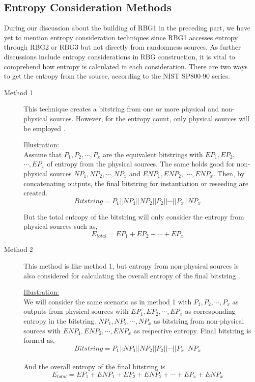 %
%
\subsection{Entropy Consideration Methods}
\label{subsec:SoA:ECM}
During our discussion about the building of RBG1 in the preceding part, we have yet to mention entropy consideration techniques since RBG1 accesses entropy through RBG2 or RBG3 but not directly from randomness sources. As further discussions include entropy considerations in RBG construction, it is vital to comprehend how entropy is calculated in each consideration. There are two ways to get the entropy from the source, according to the NIST SP800-90 series.

\begin{description}
	\item[Method 1] This technique creates a bitstring from one or more physical and non-physical sources. However, for the entropy count, only physical sources will be employed \cite{SP90C-2022}.
	
	\underline{Illustration:}\\
	Assume that $P_{1},P_{2},\cdots,P_{x}$  are the equivalent bitstrings with $EP_{1},EP_{2},$ $\cdots,EP_{x}$  of entropy from the physical sources. The same holds good for non-physical sources $NP_{1},NP_{2},\cdots,NP_{x}$ and $ENP_{1},ENP_{2},$ $\cdots,ENP_{x}$. Then, by concatenating outputs, the final bitstring for instantiation or reseeding are created.
	\begin{equation*}
	Bitstring = P_{1}||NP_{1}||NP_{2}||P_{2}||\cdots||P_{x}||NP_{x}
	\end{equation*}
	
	But the total entropy of the bitstring will only consider the entropy from physical sources such as,
	\begin{equation*}
	E_{total} = EP_{1} + EP_{2} + \cdots + EP_{x} 
	\end{equation*}
	
	\item[Method 2] This method is like method 1, but entropy from non-physical sources is also considered for calculating the overall entropy of the final bitstring \cite{SP90C-2022}.
	
	\underline{Illustration:}\\
	We will consider the same scenario as in method 1 with  $P_{1},P_{2},\cdots,P_{x}$ as outputs from physical sources with $EP_{1},EP_{2},\cdots,EP_{x}$  as corresponding entropy in the bitstring. $NP_{1},NP_{2},\cdots,NP_{x}$ as bitstring from non-physical sources with  $ENP_{1},ENP_{2},\cdots,ENP_{x}$ as respective entropy. Final bitstring is formed as,
	\begin{equation*}
	Bitstring = P_{1}||NP_{1}||NP_{2}||P_{2}||\cdots||P_{x}||NP_{x}
	\end{equation*}\\
	And the overall entropy of the final bitstring is
	\begin{equation*}
	E_{total} = EP_{1} + ENP_{1} + EP_{2} + ENP_{2} + \cdots +  EP_{x} + ENP_{x}
	\end{equation*}
\end{description}

